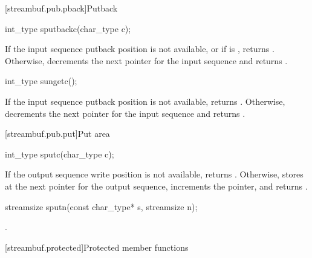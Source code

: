 [streambuf.pub.pback]{Putback}

%
\begin{itemdecl}
int_type sputbackc(char_type c);
\end{itemdecl}

\begin{itemdescr}
\pnum
\effects
If the input sequence putback position is not available, or
if
is , returns
.
Otherwise, decrements the next pointer for the input sequence and
returns
.
\end{itemdescr}

%
\begin{itemdecl}
int_type sungetc();
\end{itemdecl}

\begin{itemdescr}
\pnum
\effects
If the input sequence putback position is not available,
returns
.
Otherwise, decrements the next pointer for the input sequence and
returns
.
\end{itemdescr}

[streambuf.pub.put]{Put area}

%
\begin{itemdecl}
int_type sputc(char_type c);
\end{itemdecl}

\begin{itemdescr}
\pnum
\effects
If the output sequence write position is not available,
returns
.
Otherwise, stores  at the next pointer for the output sequence,
increments the pointer, and
returns
.
\end{itemdescr}

%
\begin{itemdecl}
streamsize sputn(const char_type* s, streamsize n);
\end{itemdecl}

\begin{itemdescr}
\pnum
\returns
{}.
\end{itemdescr}

[streambuf.protected]{Protected member functions}

